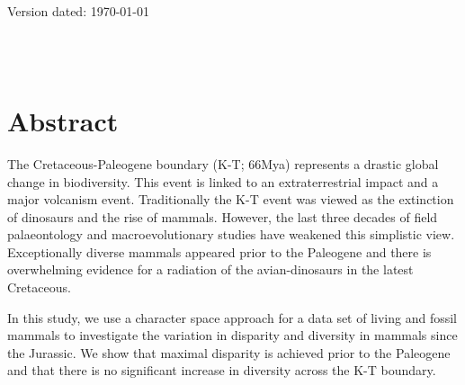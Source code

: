 \documentclass[a4paper,11pt]{article}
\begin{document}
\begin{flushright}
Version dated: \today
\end{flushright}
\begin{center}

\\
\bigskip
\\

\end{center}

\section{Abstract}
The Cretaceous-Paleogene boundary (K-T; 66Mya) represents a drastic global change in biodiversity. This event is linked to an extraterrestrial impact and a major volcanism event. Traditionally the K-T event was viewed as the extinction of dinosaurs and the rise of mammals. However, the last three decades of field palaeontology and macroevolutionary studies have weakened this simplistic view. Exceptionally diverse mammals appeared prior to the Paleogene and there is overwhelming evidence for a radiation of the avian-dinosaurs in the latest Cretaceous.

In this study, we use a character space approach for a data set of living and fossil mammals to investigate the variation in disparity and diversity in mammals since the Jurassic. We show that maximal disparity is achieved prior to the Paleogene and that there is no significant increase in diversity across the K-T boundary.
\end{document}
